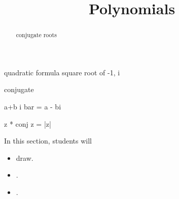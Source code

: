 \documentclass{ximera}
\title{Polynomials}
\begin{document}
\begin{abstract}
conjugate roots
\end{abstract}
\maketitle



quadratic formula square root of -1, i




conjugate

a+b i bar = a - bi

z * conj z = |z|



















\begin{sectionOutcomes}
In this section, students will 

\begin{itemize}
\item draw.
\item .
\item .
\end{itemize}
\end{sectionOutcomes}
\end{document}

